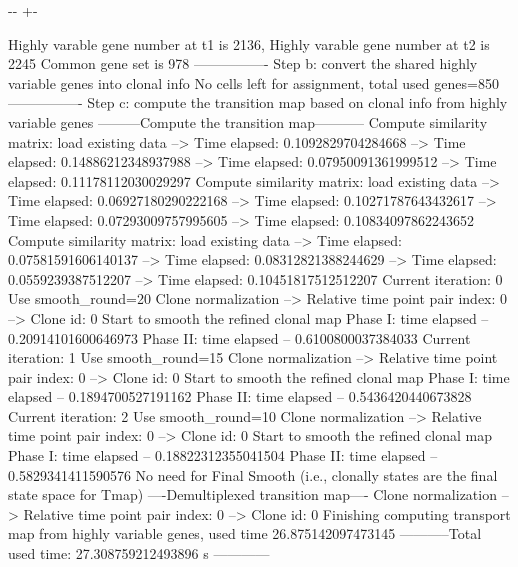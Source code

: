 \documentclass[letterpaper,10pt,english]{sphinxmanual}
\newlength\nbsphinxcodecellspacing
\begin{document}
{

\kern-\sphinxverbatimsmallskipamount\kern-\baselineskip
\kern+\FrameHeightAdjust\kern-\fboxrule
\vspace{\nbsphinxcodecellspacing}

\begin{sphinxVerbatim}[commandchars=\\\{\}]
Highly varable gene number at t1 is 2136, Highly varable gene number at t2 is 2245
Common gene set is 978
----------------
Step b: convert the shared highly variable genes into clonal info
No cells left for assignment, total used genes=850
----------------
Step c: compute the transition map based on clonal info from highly variable genes
---------Compute the transition map-----------
Compute similarity matrix: load existing data
--> Time elapsed:  0.1092829704284668
--> Time elapsed:  0.14886212348937988
--> Time elapsed:  0.07950091361999512
--> Time elapsed:  0.11178112030029297
Compute similarity matrix: load existing data
--> Time elapsed:  0.06927180290222168
--> Time elapsed:  0.10271787643432617
--> Time elapsed:  0.07293009757995605
--> Time elapsed:  0.10834097862243652
Compute similarity matrix: load existing data
--> Time elapsed:  0.07581591606140137
--> Time elapsed:  0.08312821388244629
--> Time elapsed:  0.0559239387512207
--> Time elapsed:  0.10451817512512207
Current iteration: 0
Use smooth\_round=20
Clone normalization
--> Relative time point pair index: 0
--> Clone id: 0
Start to smooth the refined clonal map
Phase I: time elapsed --  0.20914101600646973
Phase II: time elapsed --  0.6100800037384033
Current iteration: 1
Use smooth\_round=15
Clone normalization
--> Relative time point pair index: 0
--> Clone id: 0
Start to smooth the refined clonal map
Phase I: time elapsed --  0.1894700527191162
Phase II: time elapsed --  0.5436420440673828
Current iteration: 2
Use smooth\_round=10
Clone normalization
--> Relative time point pair index: 0
--> Clone id: 0
Start to smooth the refined clonal map
Phase I: time elapsed --  0.18822312355041504
Phase II: time elapsed --  0.5829341411590576
No need for Final Smooth (i.e., clonally states are the final state space for Tmap)
----Demultiplexed transition map----
Clone normalization
--> Relative time point pair index: 0
--> Clone id: 0
Finishing computing transport map from highly variable genes, used time 26.875142097473145
-----------Total used time: 27.308759212493896 s ------------
\end{sphinxVerbatim}
}
\end{document}
